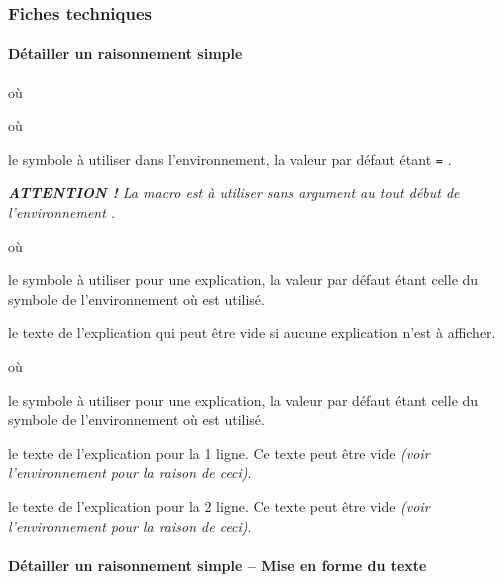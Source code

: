 \documentclass[12pt,a4paper]{article}
\begin{document}


\subsubsection{Fiches techniques}

\paragraph{Détailler un raisonnement simple} 


  où \quad {}

  où \quad {}

\IDoption{} le symbole à utiliser dans l'environnement, la valeur par défaut étant \verb+=+ .


\separation


\emph{\textbf{ATTENTION !} La macro  est à utiliser sans argument au tout début de l'environnement .}

\extraspace

\extraspace

 où \quad {}

\IDoption{} le symbole à utiliser pour une explication, la valeur par défaut étant celle du symbole de l'environnement  où  est utilisé.

\IDarg{} le texte de l'explication qui peut être vide si aucune explication n'est à afficher.


\separation


 où \quad {}

\IDoption{} le symbole à utiliser pour une explication, la valeur par défaut étant celle du symbole de l'environnement  où  est utilisé.

 le texte de l'explication pour la 1\iere{} ligne.
          Ce texte peut être vide \emph{(voir l'environnement  pour la raison de ceci)}.

 le texte de l'explication pour la 2\ieme{} ligne.
          Ce texte peut être vide \emph{(voir l'environnement  pour la raison de ceci)}.




\paragraph{Détailler un raisonnement simple -- Mise en forme du texte}
\end{document}

